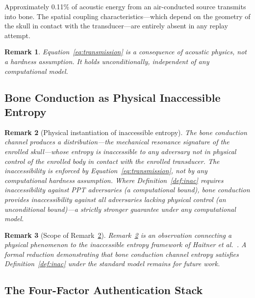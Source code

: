 \documentclass[12pt,a4paper]{article}
\newtheorem{remark}{Remark}
\begin{document}
Approximately 0.11\% of acoustic energy from an air-conducted source
transmits into bone. The spatial coupling characteristics---which depend
on the geometry of the skull in contact with the transducer---are
entirely absent in any replay attempt.

\begin{remark}
\label{rem:physics}
Equation~\eqref{eq:transmission} is a consequence of acoustic physics,
not a hardness assumption. It holds unconditionally, independent of any
computational model.
\end{remark}

\subsection{Bone Conduction as Physical Inaccessible Entropy}

\begin{remark}[Physical instantiation of inaccessible entropy]
\label{rem:inacc}
The bone conduction channel produces a distribution---the mechanical
resonance signature of the enrolled skull---whose entropy is inaccessible
to any adversary not in physical control of the enrolled body in contact
with the enrolled transducer. The inaccessibility is enforced by
Equation~\eqref{eq:transmission}, not by any computational hardness
assumption. Where Definition~\ref{def:inac} requires inaccessibility
against \textsf{PPT} adversaries (a computational bound), bone conduction
provides inaccessibility against all adversaries lacking physical control
(an unconditional bound)---a strictly stronger guarantee under any
computational model.
\end{remark}

\begin{remark}[Scope of Remark~\ref{rem:inacc}]
Remark~\ref{rem:inacc} is an observation connecting a physical phenomenon
to the inaccessible entropy framework of Haitner et
al.~\cite{Haitner10}. A formal reduction demonstrating that bone
conduction channel entropy satisfies Definition~\ref{def:inac} under the
standard model remains for future work.
\end{remark}

\subsection{The Four-Factor Authentication Stack}
\end{document}
